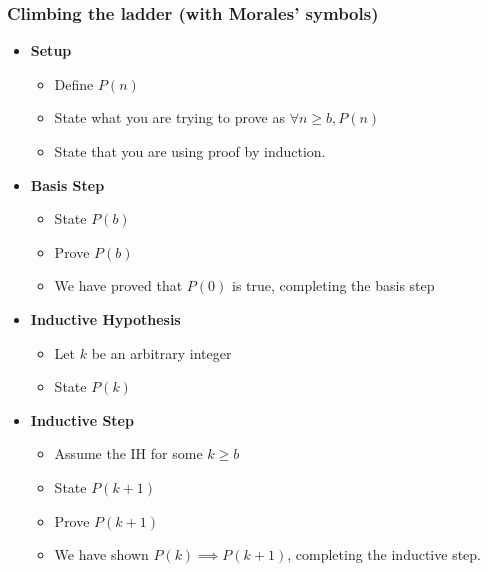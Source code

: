 \begin{frame}
  \frametitle{Climbing the ladder (with Morales' symbols)}

  \begin{itemize}
    
  \item \textbf{Setup}
    \begin{itemize}
    \item Define $P(n)$
      \pause

    \item State what you are trying to prove as $\forall n \geq b, P(n)$
      \pause
      
    \item State that you are using proof by induction.
      \pause
    \end{itemize}

  \item \textbf{Basis Step}
    \begin{itemize}
    \item State $P(b)$
      \pause
    \item Prove $P(b)$
      \pause
    \item We have proved that $P(0)$ is true, completing the basis step
      \pause
    \end{itemize}
    
  \item \textbf{Inductive Hypothesis}
    \begin{itemize}
    \item Let $k$ be an arbitrary integer
      \pause
    \item State $P(k)$
      \pause
    \end{itemize}

    
  \item \textbf{Inductive Step}
    \begin{itemize}
    \item Assume the IH for some $k \geq b$
      \pause
    \item State $P(k+1)$
      \pause
    \item Prove $P(k+1)$
      \pause
    \item We have shown $P(k) \implies P(k+1)$, completing the inductive step.
      \pause
    \end{itemize}


\end{itemize}
\end{frame}
